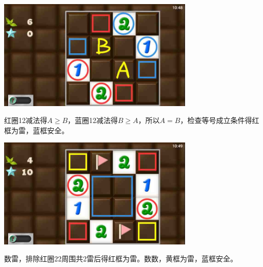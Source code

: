\subsection{} %
\begin{center}
    \includegraphics[width=0.7\textwidth]{puzzlelow/187-1.jpg}
\end{center}
红圈12减法得$A\ge B$，蓝圈12减法得$B\ge A$，所以$A=B$，检查等号成立条件得红框为雷，蓝框安全。
\begin{center}
    \includegraphics[width=0.7\textwidth]{puzzlelow/187-2.jpg}
\end{center}
数雷，排除红圈22周围共2雷后得红框为雷。数数，黄框为雷，蓝框安全。

